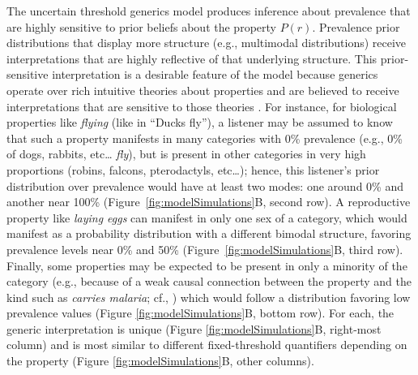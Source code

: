\documentclass[floatsintext,doc]{apa6}
\let\rmarkdownfootnote\footnote%
\def\footnote{\protect\rmarkdownfootnote}
\begin{document}
 
 The uncertain threshold generics model produces inference about prevalence that are highly sensitive to prior beliefs about the property $P(r)$. 
 Prevalence prior distributions that display more structure (e.g., multimodal distributions) receive interpretations that are highly reflective of that underlying structure.
 This prior-sensitive interpretation is a desirable feature of the model because generics operate over rich intuitive theories about properties and are believed to receive interpretations that are sensitive to those theories \cite{Leslie2007, Gelman2010:essentialist, Cimpian2010theory, Rhodes2012, Prasada2013}. 
 For instance, for biological properties like \emph{flying} (like in ``Ducks fly''), a listener may be assumed to know that such a property manifests in many categories with 0\% prevalence (e.g., 0\% of dogs, rabbits, etc\ldots{} \emph{fly}), but is present in other categories in very high proportions (robins, falcons, pterodactyls, etc\ldots{}); hence, this listener's prior distribution over prevalence would have at least two modes: one around 0\% and another near 100\% (Figure~\ref{fig:modelSimulations}B, second row).
A reproductive property like \emph{laying eggs} can manifest in only one sex of a category, which would manifest as a probability distribution with a different bimodal structure, favoring prevalence levels near 0\% and 50\% (Figure~\ref{fig:modelSimulations}B, third row).  
Finally, some properties may be expected to be present in only a minority of the category (e.g., because of a weak causal connection between the property and the kind such as \emph{carries malaria}; cf., ) which would follow a distribution  favoring low prevalence values (Figure \ref{fig:modelSimulations}B, bottom row). 
For each, the generic interpretation is unique (Figure \ref{fig:modelSimulations}B, right-most column) and is most similar to different fixed-threshold quantifiers depending on the property (Figure \ref{fig:modelSimulations}B, other columns).
\end{document}

